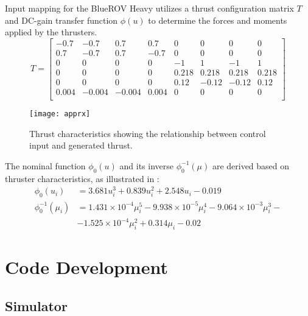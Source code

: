     Input mapping for the BlueROV Heavy utilizes a thrust 
    configuration matrix $T$ and DC-gain transfer function $\phi(u)$ to determine the forces and moments applied by the thrusters.
    \begin{equation*}
        T = \begin{bmatrix}
            -0.7 & -0.7 & 0.7 & 0.7 & 0 & 0 & 0 & 0 \\
            0.7 & -0.7 & 0.7 & -0.7 & 0 & 0 & 0 & 0 \\
            0 & 0 & 0 & 0 & -1 & 1 & -1 & 1 \\
            0 & 0 & 0 & 0 & 0.218 & 0.218 & 0.218 & 0.218 \\
            0 & 0 & 0 & 0 & 0.12 & -0.12 & -0.12 & 0.12 \\
            0.004 & -0.004 & -0.004 & 0.004 & 0 & 0 & 0 & 0 \\
            \end{bmatrix}
    \end{equation*}

    \begin{figure}[H]
        \begin{center}
            \texttt{[image: apprx]}
        \end{center}
        \caption{Thrust characteristics showing the relationship between control input and generated thrust.}
        \label{fig:thrust}
    \end{figure}

    The nominal function \(\phi_0(u)\) and its inverse \(\phi^{-1}_0(\mu)\) are derived based on thruster characteristics, as illustrated in :
    \begin{equation*}
    \begin{aligned}
        \phi_0(u_i) &= 3.681u_i^3 + 0.839u_i^2 + 2.548u_i 
        - 0.019 \\
        \phi_0^{-1}(\mu_i) &= 1.431 \times 10 ^{-4}\mu_i^5 - 9.938\times 10 ^{-5}
            \mu_i^4 - 9.064 \times 10 ^{-3} \mu_i^3 -\\
            &- 1.525\times 10 ^{-4} \mu_i^2 + 0.314 \mu_i - 0.02
    \end{aligned}
    \end{equation*}

\section{Code Development}

\subsection{Simulator}

